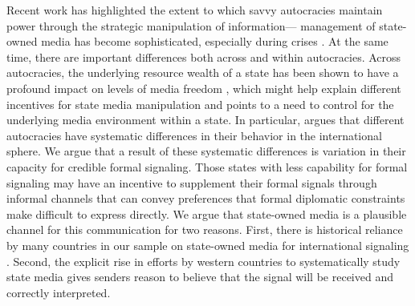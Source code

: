 \documentclass[12pt]{article}
\begin{document}
Recent work has highlighted the extent to which savvy autocracies maintain power through the strategic manipulation of information--- management of state-owned media has become sophisticated, especially during crises \citep{guriev_spin_2022}. At the same time, there are important differences both across and within autocracies. Across autocracies, the underlying resource wealth of a state has been shown to have a profound impact on levels of media freedom \citep{egorov_why_2009}, which might help explain different incentives for state media manipulation and points to a need to control for the underlying media environment within a state. In particular, \citet{weeks_autocratic_2008} argues that different autocracies have systematic differences in their behavior in the international sphere. We argue that a result of these systematic differences is variation in their capacity for credible formal signaling. Those states with less capability for formal signaling may have an incentive to supplement their formal signals through informal channels that can convey preferences that formal diplomatic constraints make difficult to express directly. We argue that state-owned media is a plausible channel for this communication for two reasons. First, there is historical reliance by many countries in our sample on state-owned media for international signaling \citep{cohen_theatre_1987}. Second, the explicit rise in efforts by western countries to systematically study state media \citep{manor_digitalization_2019, usic_ic_2024} gives senders reason to believe that the signal will be received and correctly interpreted.
\end{document}

